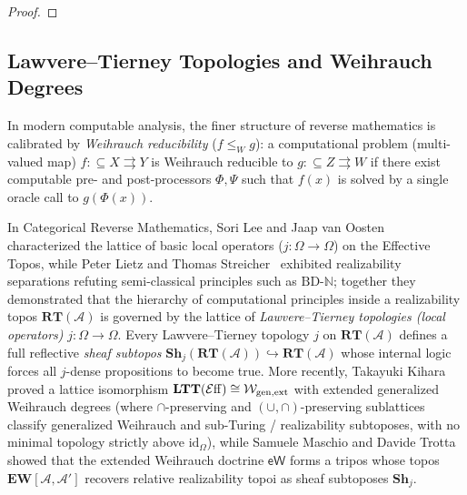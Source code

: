 \begin{proof}
\end{proof}

\subsection{Lawvere--Tierney Topologies and Weihrauch Degrees}\label{subsec:ltt-weihrauch}

In modern computable analysis, the finer structure of reverse mathematics is calibrated by \emph{Weihrauch reducibility} ($f \le_W g$): a computational problem (multi-valued map) $f: \subseteq X \rightrightarrows Y$ is Weihrauch reducible to $g: \subseteq Z \rightrightarrows W$ if there exist computable pre- and post-processors $\Phi, \Psi$ such that $f(x)$ is solved by a single oracle call to $g(\Phi(x))$.

In Categorical Reverse Mathematics, Sori Lee and Jaap van Oosten~\cite{LeeVanOosten13,vanOosten08} characterized the lattice of basic local operators ($j: \Omega \to \Omega$) on the Effective Topos, while Peter Lietz and Thomas Streicher~\cite{LietzStreicher12} exhibited realizability separations refuting semi-classical principles such as $\mathrm{BD}$-$\mathbb{N}$; together they demonstrated that the hierarchy of computational principles inside a realizability topos $\mathbf{RT}(\mathcal{A})$ is governed by the lattice of \emph{Lawvere--Tierney topologies (local operators)} $j: \Omega \to \Omega$. Every Lawvere--Tierney topology $j$ on $\mathbf{RT}(\mathcal{A})$ defines a full reflective \emph{sheaf subtopos} $\mathbf{Sh}_j(\mathbf{RT}(\mathcal{A})) \hookrightarrow \mathbf{RT}(\mathcal{A})$ whose internal logic forces all $j$-dense propositions to become true. More recently, Takayuki Kihara~\cite{Kihara23} proved a lattice isomorphism $\mathbf{LTT}(\mathcal{E}\mathrm{ff}) \cong \mathcal{W}_{\mathrm{gen,ext}}$ with extended generalized Weihrauch degrees (where $\cap$-preserving and $(\cup, \cap)$-preserving sublattices classify generalized Weihrauch and sub-Turing / realizability subtoposes, with no minimal topology strictly above $\mathrm{id}_\Omega$), while Samuele Maschio and Davide Trotta~\cite{MaschioTrotta26} showed that the extended Weihrauch doctrine $\mathsf{eW}$ forms a tripos whose topos $\mathbf{EW}[\mathcal{A}, \mathcal{A}']$ recovers relative realizability topoi as sheaf subtoposes $\mathbf{Sh}_j$.

